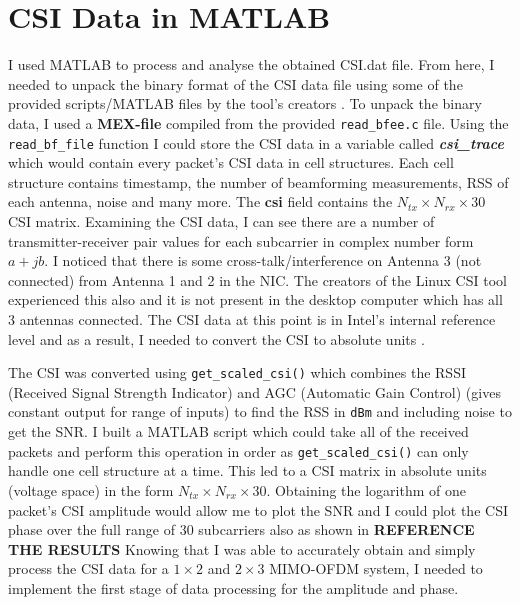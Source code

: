 \section{CSI Data in MATLAB}
I used MATLAB to process and analyse the obtained CSI.dat file. From here, I needed to unpack the binary format of the CSI data file using some of the provided scripts/MATLAB files by the tool's creators \citep{Halperin_csitool}. To unpack the binary data, I used a \textbf{MEX-file} compiled from the provided \lstinline{read_bfee.c} file. Using the \lstinline{read_bf_file} function I could store the CSI data in a variable called \textbf{\textit{csi\_trace}} which would contain every packet's CSI data in cell structures. Each cell structure contains timestamp, the number of beamforming measurements, RSS of each antenna, noise and many more. The \textbf{csi} field contains the $N_{tx}\times N_{rx}\times 30$ CSI matrix. Examining the CSI data, I can see there are a number of transmitter-receiver pair values for each subcarrier in complex number form $a + jb$. I noticed that there is some cross-talk/interference on Antenna 3 (not connected) from Antenna 1 and 2 in the NIC. The creators of the Linux CSI tool experienced this also and it is not present in the desktop computer which has all 3 antennas connected. The CSI data at this point is in Intel's internal reference level and as a result, I needed to convert the CSI to absolute units \citep{Halperin_csitool}. \par
The CSI was converted using \lstinline{get_scaled_csi()} which combines the RSSI (Received Signal Strength Indicator) and AGC (Automatic Gain Control) (gives constant output for range of inputs) to find the RSS in \lstinline{dBm} and including noise to get the SNR. I built a MATLAB script which could take all of the received packets and perform this operation in order as \lstinline{get_scaled_csi()} can only handle one cell structure at a time. This led to a CSI matrix in absolute units (voltage space) in the form $N_{tx}\times N_{rx}\times30$. Obtaining the logarithm of one packet's CSI amplitude would allow me to plot the SNR and I could plot the CSI phase over the full range of 30 subcarriers also as shown in \textbf{REFERENCE THE RESULTS}
Knowing that I was able to accurately obtain and simply process the CSI data for a $1\times 2$ and $2\times 3$ MIMO-OFDM system, I needed to implement the first stage of data processing for the amplitude and phase. 
